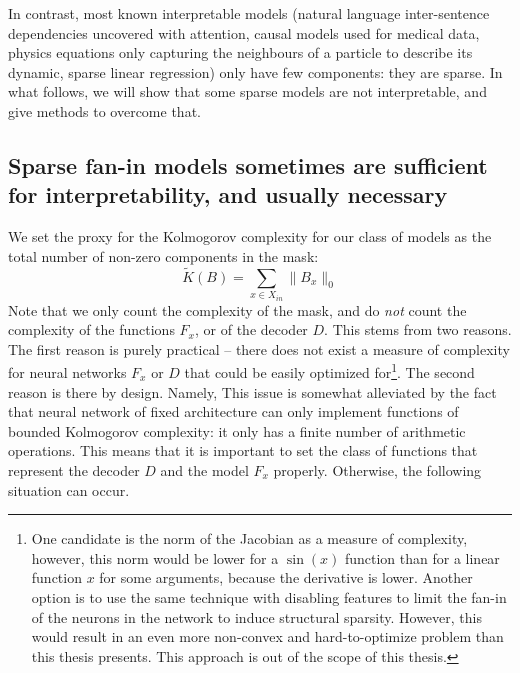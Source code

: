\documentclass[a4paper,11pt,oneside]{report}
\begin{document}
In contrast, most known interpretable models (natural language inter-sentence dependencies uncovered with attention, causal models used for medical data, physics equations only capturing the neighbours of a particle to describe its dynamic, sparse linear regression) only have few components: they are sparse. In what follows, we will show that some sparse models are not interpretable, and give methods to overcome that.

\subsection{Sparse fan-in models sometimes are sufficient for interpretability, and usually necessary}
We set the proxy for the Kolmogorov complexity for our class of models as the total number of non-zero components in the mask:
$$
\tilde{K}(B)=\sum\limits_{x\in X_{in}}\|B_x\|_0
$$
Note that we only count the complexity of the mask, and do {\em not} count the complexity of the functions $F_x$, or of the decoder $D$. This stems from two reasons. The first reason is purely practical -- there does not exist a measure of complexity for neural networks $F_x$ or $D$ that could be easily optimized for\footnote{One candidate is the norm of the Jacobian as a measure of complexity, however, this norm would be lower for a $\sin(x)$ function than for a linear function $x$ for some arguments, because the derivative is lower. Another option is to use the same technique with disabling features \cite{Oisy2019} to limit the fan-in of the neurons in the network to induce structural sparsity. However, this would result in an even more non-convex and hard-to-optimize problem than this thesis presents. This approach is out of the scope of this thesis.}. The second reason is there by design. Namely,
This issue is somewhat alleviated by the fact that neural network of fixed architecture can only implement functions of bounded Kolmogorov complexity: it only has a finite number of arithmetic operations. This means that it is important to set the class of functions that represent the decoder $D$ and the model $F_x$ properly. Otherwise, the following situation can occur.
\end{document}
